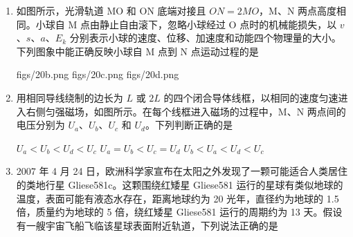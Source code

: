 \documentclass[\gkver]{gaokaozhenti}
\begin{document}
\begin{enumerate}

{M 点场强一定大于 N 点场强}
{正电荷在 M 点的电势能大于在 N 点的电势能}
{将电子从 M 点移动到 N 点，电场力做正功}


\item
如图所示，光滑轨道 MO 和 ON 底端对接且 $ON=2MO$，M、N 两点高度相同。小球自 M 点由静止自由滚下，忽略小球经过 O 点时的机械能损失，以 $v$、$s$、$a$、$E_{k}$ 分别表示小球的速度、位移、加速度和动能四个物理量的大小。下列图象中能正确反映小球自 M 点到 N 点运动过程的是


{figs/20b.png}
{figs/20c.png}
{figs/20d.png}


\item
用相同导线绕制的边长为 $L$ 或 $2L$ 的四个闭合导体线框，以相同的速度匀速进入右侧匀强磁场，如图所示。在每个线框进入磁场的过程中，M、N 两点间的电压分别为 $U_{a}$、$U_{b}$、$U_{c}$ 和 $U_{d}$。下列判断正确的是


{$U_{a}<U_{b}<U_{d}<U_{c}$}
{$U_{a}=U_{b}<U_{c}=U_{d}$}
{$U_{b}<U_{a}<U_{d}<U_{c}$}


\item
2007 年 4 月 24 日，欧洲科学家宣布在太阳之外发现了一颗可能适合人类居住的类地行星 Gliese581c。这颗围绕红矮星 Gliese581 运行的星球有类似地球的温度，表面可能有液态水存在，距离地球约为 20 光年，直径约为地球的 1.5 倍，质量约为地球的 5 倍，绕红矮星 Gliese581 运行的周期约为 13 天。假设有一艘宇宙飞船飞临该星球表面附近轨道，下列说法正确的是


\end{enumerate}
\end{document}

